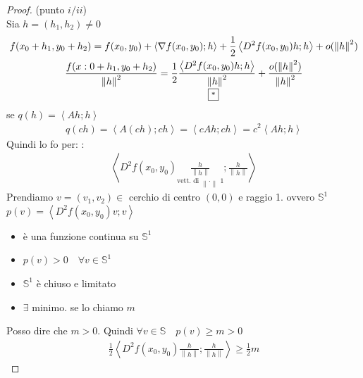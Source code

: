 \documentclass[a4paper, oneside]{article}
\begin{document}
        \begin{proof}
            (punto $i/ii$)\\
            Sia $h = (h_1,h_2) \neq 0$\\
            \begin{gather*}
                f(x_0+h_1,y_0+h_2) = f(x_0,y_0) + \left\langle \nabla f(x_0,y_0); h \right\rangle  + \frac{1}{2} \left\langle D^2 f(x_0,y_0)h;h\right\rangle +o(\left\lVert h\right\rVert^2 )\\
                \frac{f(x:0+h_1,y_0+h_2)}{\left\lVert h\right\rVert^2 } =  \underset{\text{\fbox{*}}}{\frac{1}{2} \frac{\left\langle D^2 f(x_0,y_0)h;h\right\rangle}{\left\lVert h\right\rVert^2 }} +\frac{o(\left\lVert h\right\rVert^2 )}{\left\lVert h\right\rVert^2 }\\ 
            \end{gather*}
            se $q(h) = \left\langle Ah;h\right\rangle $\\
            \begin{gather*}
                q(ch) = \left\langle A(ch) ; ch\right\rangle = \left\langle cAh;ch\right\rangle = c^2\left\langle Ah;h\right\rangle   
            \end{gather*}
            Quindi lo fo per: \fbox{*}:
            \begin{gather*}
                \left\langle D^2f(x_0,y_0) \underset{\text{vett. di $\left\lVert \cdot \right\rVert$ 1}}{\frac{h}{\left\lVert h\right\rVert }}; \frac{h}{\left\lVert h\right\rVert }\right\rangle 
            \end{gather*}
            Prendiamo $v = (v_1,v_2) \in$ cerchio di centro $(0,0)$ e raggio 1. ovvero $\mathbb{S}^1$\\
            $p(v) = \left\langle D^2f(x_0,y_0)v;v\right\rangle $\\
            \begin{itemize}
                \item è una funzione continua su $\mathbb{S}^1$
                \item $p(v) > 0 \quad \forall v \in \mathbb{S}^1$
                \item $\mathbb{S}^1$ è chiuso e limitato
                \item $\exists$ minimo. se lo chiamo $m$
            \end{itemize}
            Posso dire che $m>0$. Quindi $\forall v \in \mathbb{S} \quad p(v) \geq m > 0$
            \begin{gather*}
                \frac{1}{2}\left\langle D^2f(x_0,y_0) \frac{h}{\left\lVert h\right\rVert }; \frac{h}{\left\lVert h\right\rVert }\right\rangle \geq \frac{1}{2}m

\end{gather*}
\end{proof}
\end{document}
